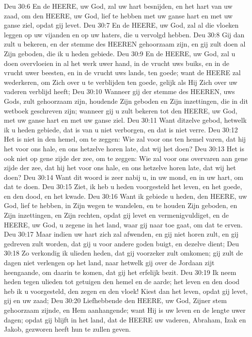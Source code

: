 Deu 30:6  En de HEERE, uw God, zal uw hart besnijden, en het hart van uw zaad, om den HEERE, uw God, lief te hebben met uw ganse hart en met uw ganse ziel, opdat gij levet.
Deu 30:7  En de HEERE, uw God, zal al die vloeken leggen op uw vijanden en op uw haters, die u vervolgd hebben.
Deu 30:8  Gij dan zult u bekeren, en der stemme des HEEREN gehoorzaam zijn, en gij zult doen al Zijn geboden, die ik u heden gebiede.
Deu 30:9  En de HEERE, uw God, zal u doen overvloeien in al het werk uwer hand, in de vrucht uws buiks, en in de vrucht uwer beesten, en in de vrucht uws lands, ten goede; want de HEERE zal wederkeren, om Zich over u te verblijden ten goede, gelijk als Hij Zich over uw vaderen verblijd heeft;
Deu 30:10  Wanneer gij der stemme des HEEREN, uws Gods, zult gehoorzaam zijn, houdende Zijn geboden en Zijn inzettingen, die in dit wetboek geschreven zijn; wanneer gij u zult bekeren tot den HEERE, uw God, met uw ganse hart en met uw ganse ziel.
Deu 30:11  Want ditzelve gebod, hetwelk ik u heden gebiede, dat is van u niet verborgen, en dat is niet verre.
Deu 30:12  Het is niet in den hemel, om te zeggen: Wie zal voor ons ten hemel varen, dat hij het voor ons hale, en ons hetzelve horen late, dat wij het doen?
Deu 30:13  Het is ook niet op gene zijde der zee, om te zeggen: Wie zal voor ons overvaren aan gene zijde der zee, dat hij het voor ons hale, en ons hetzelve horen late, dat wij het doen?
Deu 30:14  Want dit woord is zeer nabij u, in uw mond, en in uw hart, om dat te doen.
Deu 30:15  Ziet, ik heb u heden voorgesteld het leven, en het goede, en den dood, en het kwade.
Deu 30:16  Want ik gebiede u heden, den HEERE, uw God, lief te hebben, in Zijn wegen te wandelen, en te houden Zijn geboden, en Zijn inzettingen, en Zijn rechten, opdat gij levet en vermenigvuldiget, en de HEERE, uw God, u zegene in het land, waar gij naar toe gaat, om dat te erven.
Deu 30:17  Maar indien uw hart zich zal afwenden, en gij niet horen zult, en gij gedreven zult worden, dat gij u voor andere goden buigt, en dezelve dient;
Deu 30:18  Zo verkondig ik ulieden heden, dat gij voorzeker zult omkomen; gij zult de dagen niet verlengen op het land, naar hetwelk gij over de Jordaan zijt heengaande, om daarin te komen, dat gij het erfelijk bezit.
Deu 30:19  Ik neem heden tegen ulieden tot getuigen den hemel en de aarde; het leven en den dood heb ik u voorgesteld, den zegen en den vloek! Kiest dan het leven, opdat gij levet, gij en uw zaad;
Deu 30:20  Liefhebbende den HEERE, uw God, Zijner stem gehoorzaam zijnde, en Hem aanhangende; want Hij is uw leven en de lengte uwer dagen; opdat gij blijft in het land, dat de HEERE uw vaderen, Abraham, Izak en Jakob, gezworen heeft hun te zullen geven.
